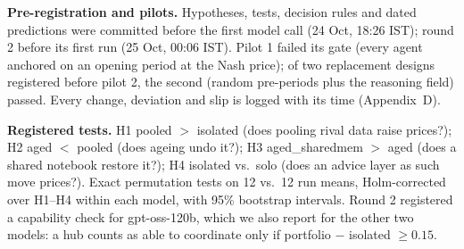 \documentclass[11pt]{article}
\newcommand{\para}[1]{\textbf{#1}\hspace{0.4em}}
\begin{document}
\para{Pre-registration and pilots.} Hypotheses, tests, decision rules and dated predictions were committed before the first model call (24 Oct, 18:26 IST); round 2 before its first run (25 Oct, 00:06 IST). Pilot 1 failed its gate (every agent anchored on an opening period at the Nash price); of two replacement designs registered before pilot 2, the second (random pre-periods plus the reasoning field) passed. Every change, deviation and slip is logged with its time (Appendix~D).

\para{Registered tests.} H1 pooled $>$ isolated (does pooling rival data raise prices?); H2 aged $<$ pooled (does ageing undo it?); H3 aged\_sharedmem $>$ aged (does a shared notebook restore it?); H4 isolated vs.\ solo (does an advice layer as such move prices?). Exact permutation tests on 12 vs.\ 12 run means, Holm-corrected over H1--H4 within each model, with 95\% bootstrap intervals. Round 2 registered a capability check for gpt-oss-120b, which we also report for the other two models: a hub counts as able to coordinate only if portfolio $-$ isolated $\geq 0.15$.
\end{document}
